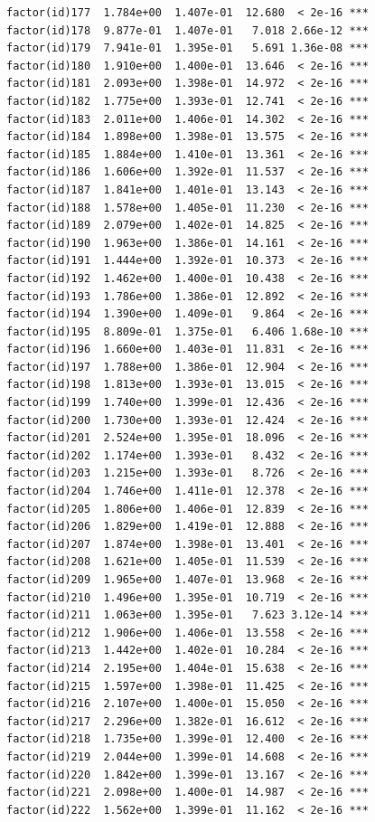 \documentclass[]{book}
\begin{document}
\begin{verbatim}
factor(id)177  1.784e+00  1.407e-01  12.680  < 2e-16 ***
factor(id)178  9.877e-01  1.407e-01   7.018 2.66e-12 ***
factor(id)179  7.941e-01  1.395e-01   5.691 1.36e-08 ***
factor(id)180  1.910e+00  1.400e-01  13.646  < 2e-16 ***
factor(id)181  2.093e+00  1.398e-01  14.972  < 2e-16 ***
factor(id)182  1.775e+00  1.393e-01  12.741  < 2e-16 ***
factor(id)183  2.011e+00  1.406e-01  14.302  < 2e-16 ***
factor(id)184  1.898e+00  1.398e-01  13.575  < 2e-16 ***
factor(id)185  1.884e+00  1.410e-01  13.361  < 2e-16 ***
factor(id)186  1.606e+00  1.392e-01  11.537  < 2e-16 ***
factor(id)187  1.841e+00  1.401e-01  13.143  < 2e-16 ***
factor(id)188  1.578e+00  1.405e-01  11.230  < 2e-16 ***
factor(id)189  2.079e+00  1.402e-01  14.825  < 2e-16 ***
factor(id)190  1.963e+00  1.386e-01  14.161  < 2e-16 ***
factor(id)191  1.444e+00  1.392e-01  10.373  < 2e-16 ***
factor(id)192  1.462e+00  1.400e-01  10.438  < 2e-16 ***
factor(id)193  1.786e+00  1.386e-01  12.892  < 2e-16 ***
factor(id)194  1.390e+00  1.409e-01   9.864  < 2e-16 ***
factor(id)195  8.809e-01  1.375e-01   6.406 1.68e-10 ***
factor(id)196  1.660e+00  1.403e-01  11.831  < 2e-16 ***
factor(id)197  1.788e+00  1.386e-01  12.904  < 2e-16 ***
factor(id)198  1.813e+00  1.393e-01  13.015  < 2e-16 ***
factor(id)199  1.740e+00  1.399e-01  12.436  < 2e-16 ***
factor(id)200  1.730e+00  1.393e-01  12.424  < 2e-16 ***
factor(id)201  2.524e+00  1.395e-01  18.096  < 2e-16 ***
factor(id)202  1.174e+00  1.393e-01   8.432  < 2e-16 ***
factor(id)203  1.215e+00  1.393e-01   8.726  < 2e-16 ***
factor(id)204  1.746e+00  1.411e-01  12.378  < 2e-16 ***
factor(id)205  1.806e+00  1.406e-01  12.839  < 2e-16 ***
factor(id)206  1.829e+00  1.419e-01  12.888  < 2e-16 ***
factor(id)207  1.874e+00  1.398e-01  13.401  < 2e-16 ***
factor(id)208  1.621e+00  1.405e-01  11.539  < 2e-16 ***
factor(id)209  1.965e+00  1.407e-01  13.968  < 2e-16 ***
factor(id)210  1.496e+00  1.395e-01  10.719  < 2e-16 ***
factor(id)211  1.063e+00  1.395e-01   7.623 3.12e-14 ***
factor(id)212  1.906e+00  1.406e-01  13.558  < 2e-16 ***
factor(id)213  1.442e+00  1.402e-01  10.284  < 2e-16 ***
factor(id)214  2.195e+00  1.404e-01  15.638  < 2e-16 ***
factor(id)215  1.597e+00  1.398e-01  11.425  < 2e-16 ***
factor(id)216  2.107e+00  1.400e-01  15.050  < 2e-16 ***
factor(id)217  2.296e+00  1.382e-01  16.612  < 2e-16 ***
factor(id)218  1.735e+00  1.399e-01  12.400  < 2e-16 ***
factor(id)219  2.044e+00  1.399e-01  14.608  < 2e-16 ***
factor(id)220  1.842e+00  1.399e-01  13.167  < 2e-16 ***
factor(id)221  2.098e+00  1.400e-01  14.987  < 2e-16 ***
factor(id)222  1.562e+00  1.399e-01  11.162  < 2e-16 ***

\end{verbatim}
\end{document}
